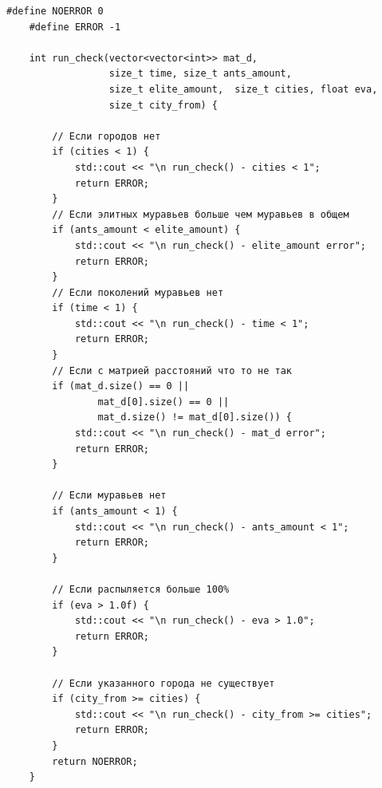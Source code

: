 \documentclass[a4paper, 14pt]{article}
\begin{document}
	 \begin{lstlisting}[label=code:run_check,caption=Функция run\_check - проверить входные данные функции run]
    #define NOERROR 0
    #define ERROR -1
    
    int run_check(vector<vector<int>> mat_d,
                  size_t time, size_t ants_amount,
                  size_t elite_amount,  size_t cities, float eva,
                  size_t city_from) {
    
        // Если городов нет
        if (cities < 1) {
            std::cout << "\n run_check() - cities < 1";
            return ERROR;
        }
        // Если элитных муравьев больше чем муравьев в общем
        if (ants_amount < elite_amount) {
            std::cout << "\n run_check() - elite_amount error";
            return ERROR;
        }
        // Если поколений муравьев нет
        if (time < 1) {
            std::cout << "\n run_check() - time < 1";
            return ERROR;
        }
        // Если c матрией расстояний что то не так
        if (mat_d.size() == 0 ||
                mat_d[0].size() == 0 ||
                mat_d.size() != mat_d[0].size()) {
            std::cout << "\n run_check() - mat_d error";
            return ERROR;
        }
    
        // Если муравьев нет
        if (ants_amount < 1) {
            std::cout << "\n run_check() - ants_amount < 1";
            return ERROR;
        }
    
        // Если распыляется больше 100%
        if (eva > 1.0f) {
            std::cout << "\n run_check() - eva > 1.0";
            return ERROR;
        }
    
        // Если указанного города не существует
        if (city_from >= cities) {
            std::cout << "\n run_check() - city_from >= cities";
            return ERROR;
        }
        return NOERROR;
    }
	\end{lstlisting}
	
\end{document}
